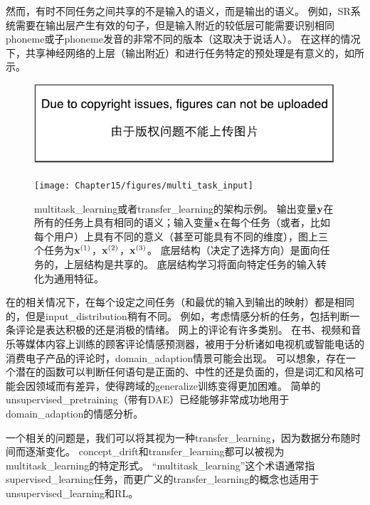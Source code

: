 然而，有时不同任务之间共享的不是输入的语义，而是输出的语义。
例如，\gls{SR}系统需要在输出层产生有效的句子，但是输入附近的较低层可能需要识别相同\gls{phoneme}或子\gls{phoneme}发音的非常不同的版本（这取决于说话人）。
在这样的情况下，共享神经网络的上层（输出附近）和进行任务特定的预处理是有意义的，如所示。


\begin{figure}[!htb]
\ifOpenSource
\centerline{\includegraphics{figure.pdf}}
\else
\centerline{\texttt{[image: Chapter15/figures/multi\_task\_input]}}
\fi
\caption{\gls{multitask_learning}或者\gls{transfer_learning}的架构示例。
输出变量$\mathbf{y}$在所有的任务上具有相同的语义；输入变量$\mathbf{x}$在每个任务（或者，比如每个用户）上具有不同的意义（甚至可能具有不同的维度），图上三个任务为$\mathbf{x}^{(1)}$，$\mathbf{x}^{(2)}$，$\mathbf{x}^{(3)}$。
底层结构（决定了选择方向）是面向任务的，上层结构是共享的。
底层结构学习将面向特定任务的输入转化为通用特征。
}
\label{fig:chap15_multi_task_input}
\end{figure}


在的相关情况下，在每个设定之间任务（和最优的输入到输出的映射）都是相同的，但是\gls{input_distribution}稍有不同。 
例如，考虑情感分析的任务，包括判断一条评论是表达积极的还是消极的情绪。 
网上的评论有许多类别。
在书、视频和音乐等媒体内容上训练的顾客评论情感预测器，被用于分析诸如电视机或智能电话的消费电子产品的评论时，\gls{domain_adaption}情景可能会出现。%
可以想象，存在一个潜在的函数可以判断任何语句是正面的、中性的还是负面的，但是词汇和风格可能会因领域而有差异，使得跨域的\gls{generalize}训练变得更加困难。
简单的\gls{unsupervised_pretraining}（带有\gls{DAE}）已经能够非常成功地用于\gls{domain_adaption}的情感分析\citep{Glorot+al-ICML-2011}。

一个相关的问题是，我们可以将其视为一种\gls{transfer_learning}，因为数据分布随时间而逐渐变化。
\gls{concept_drift}和\gls{transfer_learning}都可以被视为\gls{multitask_learning}的特定形式。
``\gls{multitask_learning}''这个术语通常指\gls{supervised_learning}任务，而更广义的\gls{transfer_learning}的概念也适用于\gls{unsupervised_learning}和\gls{RL}。


